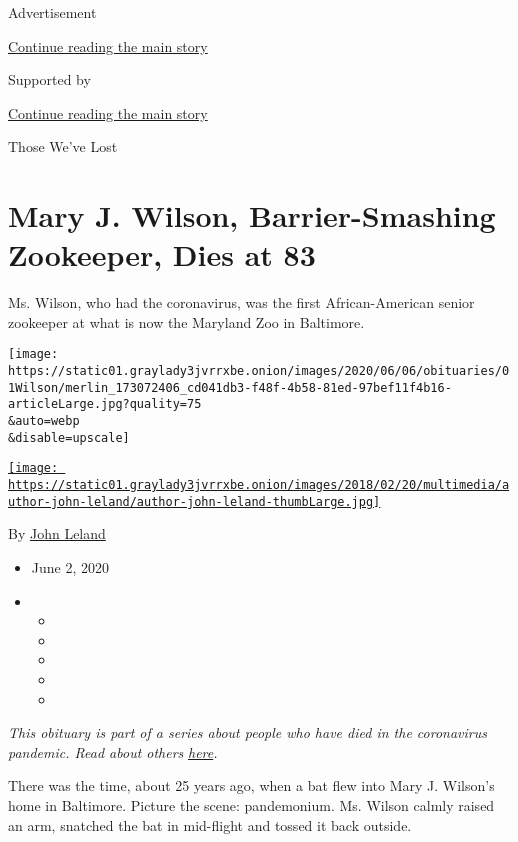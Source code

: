Advertisement

\protect\hyperlink{after-top}{Continue reading the main story}

Supported by

\protect\hyperlink{after-sponsor}{Continue reading the main story}

Those We've Lost

\hypertarget{mary-j-wilson-barrier-smashing-zookeeper-dies-at-83}{%
\section{Mary J. Wilson, Barrier-Smashing Zookeeper, Dies at
83}\label{mary-j-wilson-barrier-smashing-zookeeper-dies-at-83}}

Ms. Wilson, who had the coronavirus, was the first African-American
senior zookeeper at what is now the Maryland Zoo in Baltimore.

\texttt{[image: https://static01.graylady3jvrrxbe.onion/images/2020/06/06/obituaries/01Wilson/merlin\_173072406\_cd041db3-f48f-4b58-81ed-97bef11f4b16-articleLarge.jpg?quality=75\\\&auto=webp\\\&disable=upscale]}

\href{https://www.nytimes3xbfgragh.onion/by/john-leland}{\texttt{[image: https://static01.graylady3jvrrxbe.onion/images/2018/02/20/multimedia/author-john-leland/author-john-leland-thumbLarge.jpg]}}

By \href{https://www.nytimes3xbfgragh.onion/by/john-leland}{John Leland}

\begin{itemize}
\item
  June 2, 2020
\item
  \begin{itemize}
  \item
  \item
  \item
  \item
  \item
  \end{itemize}
\end{itemize}

\emph{This obituary is part of a series about people who have died in
the coronavirus pandemic. Read about others}
\href{https://www.nytimes3xbfgragh.onion/interactive/2020/obituaries/people-died-coronavirus-obituaries.html}{\emph{here}}\emph{.}

There was the time, about 25 years ago, when a bat flew into Mary J.
Wilson's home in Baltimore. Picture the scene: pandemonium. Ms. Wilson
calmly raised an arm, snatched the bat in mid-flight and tossed it back
outside.

